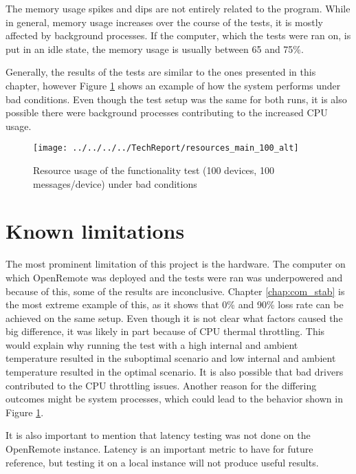 The memory usage spikes and dips are not entirely related to the program. While in general, memory usage increases over the course of the tests, it is mostly affected by background processes. If the computer, which the tests were ran on, is put in an idle state, the memory usage is usually between 65 and 75\%.

Generally, the results of the tests are similar to the ones presented in this chapter, however Figure \ref{fig:resourcesmain100alt} shows an example of how the system performs under bad conditions. Even though the test setup was the same for both runs, it is also possible there were background processes contributing to the increased CPU usage.

\begin{figure}[ht]
	\centering
	\texttt{[image: ../../../../TechReport/resources\_main\_100\_alt]}
	\caption{Resource usage of the functionality test (100 devices, 100 messages/device) under bad conditions}
	\label{fig:resourcesmain100alt}
\end{figure}


\section{Known limitations}
The most prominent limitation of this project is the hardware. The computer on which OpenRemote was deployed and the tests were ran was underpowered and because of this, some of the results are inconclusive. Chapter \ref{chap:com_stab} is the most extreme example of this, as it shows that 0\% and 90\% loss rate can be achieved on the same setup. Even though it is not clear what factors caused the big difference, it was likely in part because of CPU thermal throttling. This would explain why running the test with a high internal and ambient temperature resulted in the suboptimal scenario and low internal and ambient temperature resulted in the optimal scenario. It is also possible that bad drivers contributed to the CPU throttling issues. Another reason for the differing outcomes might be system processes, which could lead to the behavior shown in Figure \ref{fig:resourcesmain100alt}.

It is also important to mention that latency testing was not done on the OpenRemote instance. Latency is an important metric to have for future reference, but testing it on a local instance will not produce useful results.

